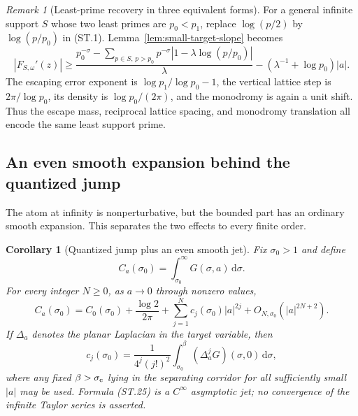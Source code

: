 \documentclass[11pt]{article}
\newtheorem{corollary}[theorem]{Corollary}
\theoremstyle{definition}
\theoremstyle{remark}
\newtheorem{remark}[theorem]{Remark}
\newcommand{\dd}{\,\mathrm d}
\begin{document}
\begin{remark}[Least-prime recovery in three equivalent forms]
For a general infinite support $S$ whose two least primes are $p_0<p_1$, replace
$\log(p/2)$ by $\log(p/p_0)$ in (ST.1).  Lemma~\ref{lem:small-target-slope} becomes
\[
 |F_{S,\omega}'(z)|
 \ge
 \frac{p_0^{-\sigma}-
  \sum_{p\in S,\,p>p_0}p^{-\sigma}|1-\lambda\log(p/p_0)|}{\lambda}
 -\left(\lambda^{-1}+\log p_0\right)|a|.
 \tag{ST.24}
\]
The escaping error exponent is $\log p_1/\log p_0-1$, the vertical lattice step is
$2\pi/\log p_0$, its density is $\log p_0/(2\pi)$, and the monodromy is again a
unit shift.  Thus the escape mass, reciprocal lattice spacing, and monodromy translation
all encode the same least support prime.
\end{remark}

\subsection{An even smooth expansion behind the quantized jump}

The atom at infinity is nonperturbative, but the bounded part has an ordinary smooth
expansion.  This separates the two effects to every finite order.

\begin{corollary}[Quantized jump plus an even smooth jet]
\label{cor:even-escape-jet}
Fix $\sigma_0>1$ and define
\[
 C_a(\sigma_0)=\int_{\sigma_0}^{\infty}G(\sigma,a)\dd\sigma.
\]
For every integer $N\ge0$, as $a\to0$ through nonzero values,
\[
 \boxed{
 C_a(\sigma_0)
 =C_0(\sigma_0)+\frac{\log2}{2\pi}
  +\sum_{j=1}^{N}c_j(\sigma_0)|a|^{2j}
  +O_{N,\sigma_0}(|a|^{2N+2}).
 }
\tag{ST.25}
\]
If $\Delta_a$ denotes the planar Laplacian in the target variable, then
\[
 c_j(\sigma_0)
 =\frac{1}{4^j(j!)^2}
   \int_{\sigma_0}^{\beta}(\Delta_a^jG)(\sigma,0)\dd\sigma,
 \tag{ST.26}
\]
where any fixed $\beta>\sigma_{\rm e}$ lying in the separating corridor for all
sufficiently small $|a|$ may be used.  Formula (ST.25) is a $C^\infty$ asymptotic jet;
no convergence of the infinite Taylor series is asserted.
\end{corollary}
\end{document}
